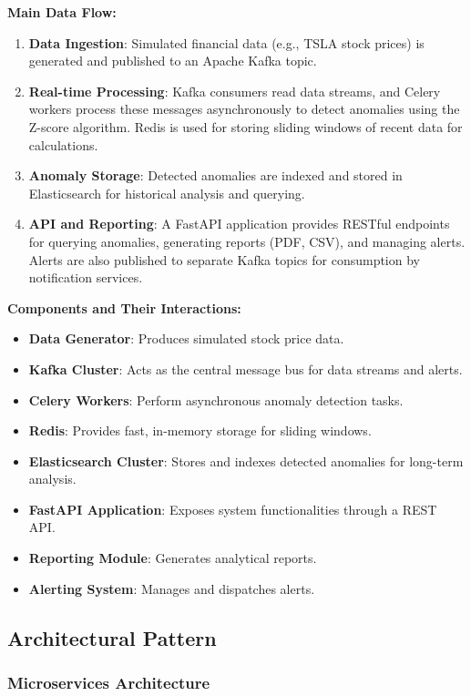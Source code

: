 \textbf{Main Data Flow:}
\begin{enumerate}
    \item \textbf{Data Ingestion}: Simulated financial data (e.g., TSLA stock prices) is generated and published to an Apache Kafka topic.
    \item \textbf{Real-time Processing}: Kafka consumers read data streams, and Celery workers process these messages asynchronously to detect anomalies using the Z-score algorithm. Redis is used for storing sliding windows of recent data for calculations.
    \item \textbf{Anomaly Storage}: Detected anomalies are indexed and stored in Elasticsearch for historical analysis and querying.
    \item \textbf{API and Reporting}: A FastAPI application provides RESTful endpoints for querying anomalies, generating reports (PDF, CSV), and managing alerts. Alerts are also published to separate Kafka topics for consumption by notification services.
\end{enumerate}

\textbf{Components and Their Interactions:}
\begin{itemize}
    \item \textbf{Data Generator}: Produces simulated stock price data.
    \item \textbf{Kafka Cluster}: Acts as the central message bus for data streams and alerts.
    \item \textbf{Celery Workers}: Perform asynchronous anomaly detection tasks.
    \item \textbf{Redis}: Provides fast, in-memory storage for sliding windows.
    \item \textbf{Elasticsearch Cluster}: Stores and indexes detected anomalies for long-term analysis.
    \item \textbf{FastAPI Application}: Exposes system functionalities through a REST API.
    \item \textbf{Reporting Module}: Generates analytical reports.
    \item \textbf{Alerting System}: Manages and dispatches alerts.
\end{itemize}

\subsection{Architectural Pattern}

\subsubsection{Microservices Architecture}

